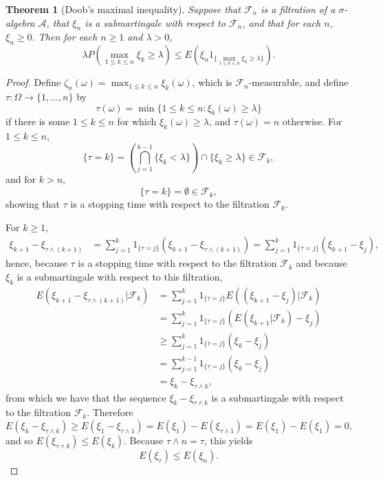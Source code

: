 \documentclass{article}
\newtheorem{theorem}{Theorem}
\theoremstyle{definition}
\begin{document}
\begin{theorem}[Doob's maximal inequality]
Suppose that $\mathscr{F}_n$ is a filtration of a $\sigma$-algebra $\mathscr{A}$, that
$\xi_n$ is a submartingale with respect to $\mathscr{F}_n$, and that
for each $n$, $\xi_n \geq 0$. Then for each $n \geq 1$ and $\lambda>0$,
\[
\lambda P\left(\max_{1 \leq k \leq n} \xi_k \geq \lambda \right) \leq 
E\left(\xi_n 1_{\{\max_{1 \leq k \leq n} \xi_k \geq \lambda\}}\right).
\]
\end{theorem}
\begin{proof}
Define $\zeta_n(\omega) = \max_{1 \leq k \leq n} \xi_k(\omega)$, which is $\mathscr{F}_n$-measurable, and define
$\tau:\Omega \to \{1,\ldots,n\}$ by
\[
\tau(\omega) = \min\{1 \leq k \leq n: \xi_k(\omega) \geq \lambda\}
\]
if there is some $1 \leq k \leq n$ for which $\xi_k(\omega) \geq \lambda$, and $\tau(\omega)=n$ otherwise.
For $1 \leq k \leq n$,
\[
\{\tau = k\} = \left( \bigcap_{j=1}^{k-1} \{\xi_k<\lambda\}\right) \cap \{\xi_k \geq \lambda\} \in \mathscr{F}_k,
\]
and for $k>n$, 
\[
\{\tau = k\} = \emptyset \in \mathscr{F}_k,
\]
showing that $\tau$ is a stopping time with respect to the filtration $\mathscr{F}_k$. 

For $k \geq 1$,
\begin{align*}
\xi_{k+1}-\xi_{\tau \wedge (k+1)}&=\sum_{j=1}^k  1_{\{\tau=j\}} (\xi_{k+1}-\xi_{\tau \wedge (k+1)})
=\sum_{j=1}^k 1_{\{\tau=j\}} (\xi_{k+1}-\xi_j),
\end{align*}
hence, because $\tau$ is a stopping time with respect to the filtration $\mathscr{F}_k$ and because $\xi_k$ is a submartingale
with respect to this filtration,
\begin{align*}
E(\xi_{k+1}-\xi_{\tau \wedge (k+1)}|\mathscr{F}_k)&=\sum_{j=1}^k 1_{\{\tau=j\}} E((\xi_{k+1}-\xi_j)  | \mathscr{F}_k)\\
&=\sum_{j=1}^k 1_{\{\tau=j\}} (E(\xi_{k+1}|\mathscr{F}_k) - \xi_j)\\
&\geq \sum_{j=1}^k 1_{\{\tau=j\}} (\xi_k -\xi_j)\\
&=\sum_{j=1}^{k-1} 1_{\{\tau=j\}} (\xi_k-\xi_j)\\
&=\xi_k - \xi_{\tau \wedge k},
\end{align*}
from which we have that the sequence $\xi_k - \xi_{\tau \wedge k}$ is a submartingale with respect to the filtration
$\mathscr{F}_k$. Therefore
\[
E(\xi_k - \xi_{\tau \wedge k}) \geq E(\xi_1 - \xi_{\tau \wedge 1}) = E(\xi_1)-E( \xi_{\tau \wedge 1})=
E(\xi_1)-E(\xi_1)=0,
\]
and so
$E(\xi_{\tau \wedge k}) \leq E(\xi_k)$.
Because $\tau \wedge n = \tau$, this yields
\[
E(\xi_\tau) \leq E(\xi_n).
\]


\end{proof}
\end{document}
